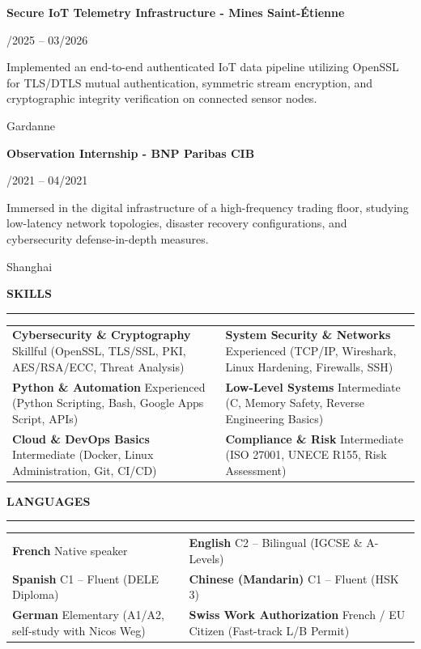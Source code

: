 \documentclass[10pt,a4paper]{article}
\newcommand{\cvSection}[1]{%
  \vspace{6.5pt}%
  {\fontsize{10.5}{12}\selectfont \textbf{#1}}\par\vspace{1.5pt}%
  \rule{\textwidth}{0.75pt}\par\vspace{4.5pt}%
}
\newcommand{\cvItem}[4]{%
  \noindent
  \parbox[t]{0.75\textwidth}{\raggedright \textbf{#1}}\hfill
  \parbox[t]{0.24\textwidth}{\raggedleft \fontsize{8.5}{10.5}\selectfont #2}\par
  \vspace{1.5pt}
  \noindent
  \parbox[t]{0.75\textwidth}{\fontsize{8.7}{11.2}\selectfont #4}\hfill
  \parbox[t]{0.24\textwidth}{\raggedleft \fontsize{8.5}{10.5}\selectfont #3}\par
  \vspace{5pt}
}
\begin{document}
\cvItem{Secure IoT Telemetry Infrastructure - Mines Saint-Étienne}{10/2025 -- 03/2026}{Gardanne}{Implemented an end-to-end authenticated IoT data pipeline utilizing OpenSSL for TLS/DTLS mutual authentication, symmetric stream encryption, and cryptographic integrity verification on connected sensor nodes.}

\cvItem{Observation Internship - BNP Paribas CIB}{04/2021 -- 04/2021}{Shanghai}{Immersed in the digital infrastructure of a high-frequency trading floor, studying low-latency network topologies, disaster recovery configurations, and cybersecurity defense-in-depth measures.}

\cvSection{SKILLS}
\begin{tabularx}{\textwidth}{@{}X X@{}}
  \textbf{Cybersecurity \& Cryptography} \newline
  {\fontsize{8.5}{10.5}\selectfont Skillful (OpenSSL, TLS/SSL, PKI, AES/RSA/ECC, Threat Analysis)} &
  \textbf{System Security \& Networks} \newline
  {\fontsize{8.5}{10.5}\selectfont Experienced (TCP/IP, Wireshark, Linux Hardening, Firewalls, SSH)} \\[4.5pt]
  
  \textbf{Python \& Automation} \newline
  {\fontsize{8.5}{10.5}\selectfont Experienced (Python Scripting, Bash, Google Apps Script, APIs)} &
  \textbf{Low-Level Systems} \newline
  {\fontsize{8.5}{10.5}\selectfont Intermediate (C, Memory Safety, Reverse Engineering Basics)} \\[4.5pt]
  
  \textbf{Cloud \& DevOps Basics} \newline
  {\fontsize{8.5}{10.5}\selectfont Intermediate (Docker, Linux Administration, Git, CI/CD)} &
  \textbf{Compliance \& Risk} \newline
  {\fontsize{8.5}{10.5}\selectfont Intermediate (ISO 27001, UNECE R155, Risk Assessment)}
\end{tabularx}

\cvSection{LANGUAGES}
\begin{tabularx}{\textwidth}{@{}X X@{}}
  \textbf{French} \newline
  {\fontsize{8.5}{10.5}\selectfont Native speaker} &
  \textbf{English} \newline
  {\fontsize{8.5}{10.5}\selectfont C2 -- Bilingual (IGCSE \& A-Levels)} \\[4.5pt]
  
  \textbf{Spanish} \newline
  {\fontsize{8.5}{10.5}\selectfont C1 -- Fluent (DELE Diploma)} &
  \textbf{Chinese (Mandarin)} \newline
  {\fontsize{8.5}{10.5}\selectfont C1 -- Fluent (HSK 3)} \\[4.5pt]
  
  \textbf{German} \newline
  {\fontsize{8.5}{10.5}\selectfont Elementary (A1/A2, self-study with Nicos Weg)} &
  \textbf{Swiss Work Authorization} \newline
  {\fontsize{8.5}{10.5}\selectfont French / EU Citizen (Fast-track L/B Permit)}
\end{tabularx}
\end{document}
